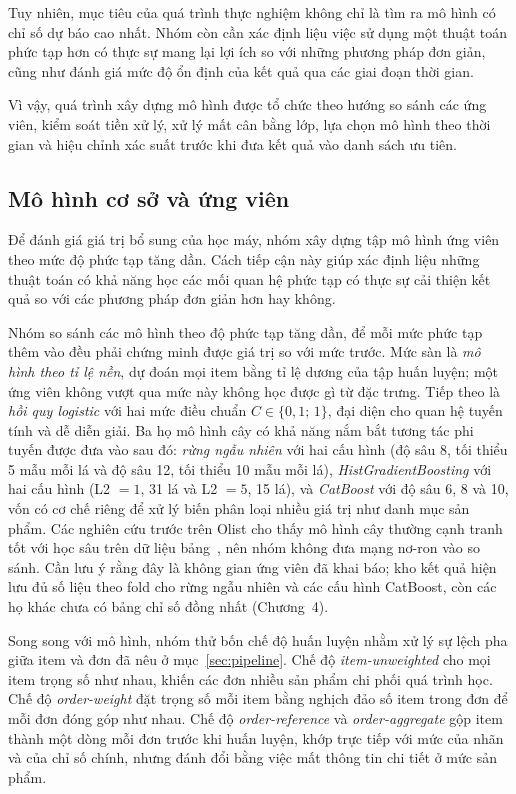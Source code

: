 \documentclass[12pt,a4paper]{report}
\begin{document}
Tuy nhiên, mục tiêu của quá trình thực nghiệm không chỉ là tìm ra mô hình có chỉ số dự báo cao nhất. Nhóm còn cần xác định liệu việc sử dụng một thuật toán phức tạp hơn có thực sự mang lại lợi ích so với những phương pháp đơn giản, cũng như đánh giá mức độ ổn định của kết quả qua các giai đoạn thời gian.

Vì vậy, quá trình xây dựng mô hình được tổ chức theo hướng so sánh các ứng viên, kiểm soát tiền xử lý, xử lý mất cân bằng lớp, lựa chọn mô hình theo thời gian và hiệu chỉnh xác suất trước khi đưa kết quả vào danh sách ưu tiên.

\subsection{Mô hình cơ sở và ứng viên}

Để đánh giá giá trị bổ sung của học máy, nhóm xây dựng tập mô hình ứng viên theo mức độ phức tạp tăng dần. Cách tiếp cận này giúp xác định liệu những thuật toán có khả năng học các mối quan hệ phức tạp có thực sự cải thiện kết quả so với các phương pháp đơn giản hơn hay không.

Nhóm so sánh các mô hình theo độ phức tạp tăng dần, để mỗi mức phức tạp thêm vào đều phải chứng minh được giá trị so với mức trước. Mức sàn là \emph{mô hình theo tỉ lệ nền}, dự đoán mọi item bằng tỉ lệ dương của tập huấn luyện; một ứng viên không vượt qua mức này không học được gì từ đặc trưng. Tiếp theo là \emph{hồi quy logistic} với hai mức điều chuẩn $C \in \{0{,}1;\,1\}$, đại diện cho quan hệ tuyến tính và dễ diễn giải. Ba họ mô hình cây có khả năng nắm bắt tương tác phi tuyến được đưa vào sau đó: \emph{rừng ngẫu nhiên} với hai cấu hình (độ sâu 8, tối thiểu 5 mẫu mỗi lá và độ sâu 12, tối thiểu 10 mẫu mỗi lá), \emph{HistGradientBoosting} với hai cấu hình (L2 $=1$, 31 lá và L2 $=5$, 15 lá), và \emph{CatBoost} với độ sâu 6, 8 và 10, vốn có cơ chế riêng để xử lý biến phân loại nhiều giá trị như danh mục sản phẩm. Các nghiên cứu trước trên Olist cho thấy mô hình cây thường cạnh tranh tốt với học sâu trên dữ liệu bảng~\cite{zaghloul2024}, nên nhóm không đưa mạng nơ-ron vào so sánh. Cần lưu ý rằng đây là không gian ứng viên đã khai báo; kho kết quả hiện lưu đủ số liệu theo fold cho rừng ngẫu nhiên và các cấu hình CatBoost, còn các họ khác chưa có bảng chỉ số đồng nhất (Chương~4).

Song song với mô hình, nhóm thử bốn chế độ huấn luyện nhằm xử lý sự lệch pha giữa item và đơn đã nêu ở mục~\ref{sec:pipeline}. Chế độ \emph{item-unweighted} cho mọi item trọng số như nhau, khiến các đơn nhiều sản phẩm chi phối quá trình học. Chế độ \emph{order-weight} đặt trọng số mỗi item bằng nghịch đảo số item trong đơn để mỗi đơn đóng góp như nhau. Chế độ \emph{order-reference} và \emph{order-aggregate} gộp item thành một dòng mỗi đơn trước khi huấn luyện, khớp trực tiếp với mức của nhãn và của chỉ số chính, nhưng đánh đổi bằng việc mất thông tin chi tiết ở mức sản phẩm. 
\end{document}
